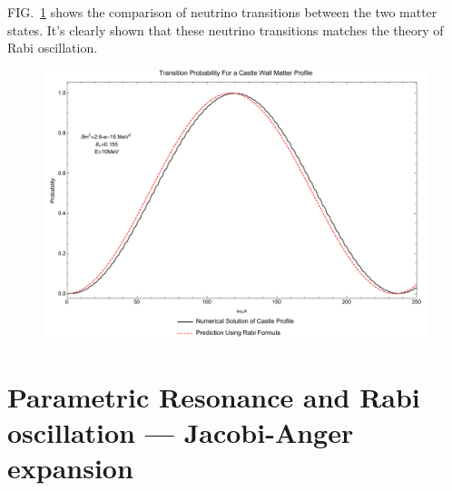 \documentclass[%
reprint,
 amsmath,amssymb,
 aps,
]{revtex4-1}
\begin{document}
FIG.~\ref{fig-akhmedovOscPlt} shows the comparison of neutrino transitions between the two matter states. It's clearly shown that these neutrino transitions matches the theory of Rabi oscillation.

\begin{figure}[!htbp]
                \centering
                \includegraphics[width=\columnwidth]{assets/akhmedovOscPlt}
                \caption{
                }
                \label{fig-akhmedovOscPlt}
\end{figure}










\section{\label{sec:jacobi}Parametric Resonance and Rabi oscillation --- Jacobi-Anger expansion}
\end{document}
